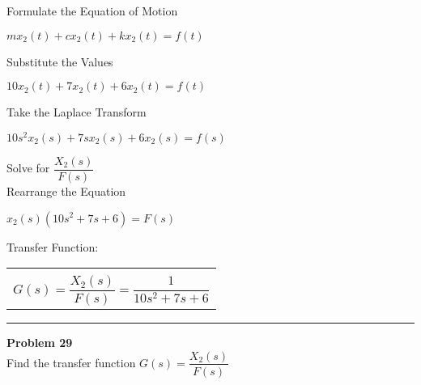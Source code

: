 \documentclass[11pt,letterpaper]{article}
\begin{document}
Formulate the Equation of Motion\\
\begin{center}
	$mx_2(t)+cx_2(t)+kx_2(t)=f(t)$\\
\end{center}
Substitute the Values\\
\begin{center}
	$10x_2(t)+7x_2(t)+6x_2(t)=f(t)$\\
\end{center}
Take the Laplace Transform\\
\begin{center}
	$10s^2x_2(s)+7sx_2(s)+6x_2(s)=f(s)$\\
\end{center}
Solve for $\dfrac{X_2(s)}{F(s)}$\\[12pt]
Rearrange the Equation\\
\begin{center}
	$x_2(s)(10s^2+7s+6)=F(s)$\\
\end{center}
Transfer Function:\\
\begin{center}
	\begin{tabular}{|c|}
		\hline \\
		$G(s)=\dfrac{X_2(s)}{F(s)}=\dfrac{1}{10s^2+7s+6}$	\\ [12pt]
	\hline
	\end{tabular}	
\end{center}

\clearpage

\rule{\textwidth}{1pt}
\textbf{Problem 29}\\
Find the transfer function $G(s)=\dfrac{X_2(s)}{F(s)}$\\
\end{document}

